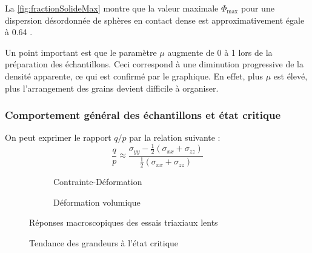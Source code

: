 \documentclass[a4paper,12pt]{report}
\begin{document}
La \autoref{fig:fractionSolideMax} montre que la valeur maximale $\Phi_{\max}$ pour une dispersion désordonnée de sphères en contact dense est approximativement égale à 0.64  \citep{combe2023demlecture}.  

Un point important est que le paramètre $\mu$ augmente de 0 à 1 lors de la préparation des échantillons. Ceci correspond à une diminution progressive de la densité apparente, ce qui est confirmé par le graphique. En effet, plus $\mu$ est élevé, plus l’arrangement des grains devient difficile à organiser.

\subsubsection{Comportement général des échantillons et état critique}

On peut exprimer le rapport $q/p$ par la relation suivante :
\begin{equation}
\frac{q}{p} \approx \frac{\sigma_{yy} - \frac{1}{2}(\sigma_{xx} + \sigma_{zz})}{\frac{1}{2}(\sigma_{xx} + \sigma_{zz})}
\label{eq:qformulation}
\end{equation}

\begin{figure}[htbp]
    \centering
    \begin{subfigure}[b]{0.49\textwidth}
        \centering
        \scalebox{0.5}{}
        \caption{Contrainte-Déformation}
        \label{fig:contrainte}
    \end{subfigure}
    \hfill
    \begin{subfigure}[b]{0.49\textwidth}
        \centering
        \scalebox{0.5}{}
        \caption{Déformation volumique}
        \label{fig:defvo}
    \end{subfigure}
    \caption{Réponses macroscopiques des essais triaxiaux lents}
    \label{fig:comparaison}
\end{figure}

\begin{figure}[h!]
    \centering
    \caption{Tendance des grandeurs à l’état critique}
    \label{fig:Palier}
\end{figure}
\end{document}
